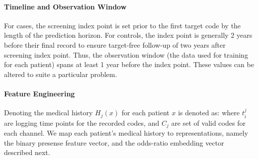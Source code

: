 \paragraph*{Timeline and Observation Window} For cases, the screening index point is set  prior to the first target code by the length of the prediction horizon. For controls, the index point is generally  2 years before their final record to ensure target-free follow-up of two years after screening index point. Thus, the observation window (the data used for training for each patient) spans at least 1 year  before the index point. These values can be altered to suite a particular problem.




 

\paragraph*{Feature Engineering}
Denoting the  medical history $H_j(x)$  for each patient $x$ is denoted as: 
%
where $t_i^j$ are logging time points for the recorded codes, and $C_j$ are set of valid codes for each channel. We map each patient's medical history to representations, namely the binary presense feature vector, and the odds-ratio embedding vector described next.

